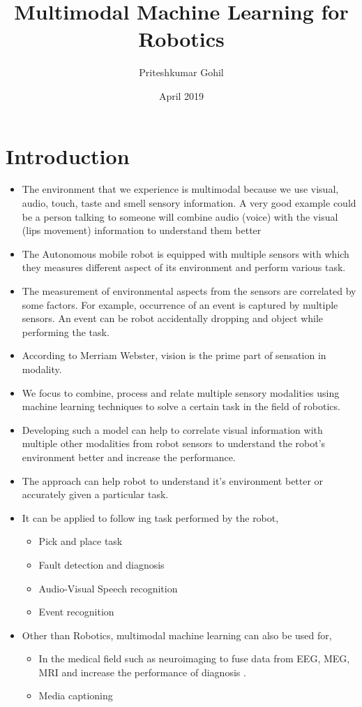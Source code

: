 \documentclass[rnd]{mas_proposal}
\title{Multimodal Machine Learning for Robotics}
\author{Priteshkumar Gohil}
\date{April 2019}
\begin{document}
\maketitle

\pagestyle{plain}

\chapter{Introduction}
\begin{itemize}
    \item The environment that we experience is multimodal because we use visual, audio, touch, taste and smell sensory information. A very good example could be a person talking to someone will combine audio (voice) with the visual (lips movement) information to understand them better
    \item The Autonomous mobile robot is equipped with multiple sensors with which they measures different aspect of its environment and perform various task. 
    \item The measurement of environmental aspects from the sensors are correlated by some factors. For example, occurrence of an event is captured by multiple sensors. An event can be robot accidentally dropping and object while performing the task. 
    \item According to Merriam Webster, vision is the prime part of sensation in modality.
    \item We focus to combine, process and relate multiple sensory modalities using machine learning techniques to solve a certain task in the field of robotics.
    \item Developing such a model can help to correlate visual information with multiple other modalities from robot sensors to understand the robot's environment better and increase the performance.
    
    \item The approach can help robot to understand it's environment better or accurately given a particular task.
	\item It can be applied to follow ing task performed by the robot,
	\begin{itemize}
		\item Pick and place task
		\item Fault detection and diagnosis
		\item Audio-Visual Speech recognition
		\item Event recognition
	\end{itemize}
	\item Other than Robotics, multimodal machine learning can also be used for,
	\begin{itemize}
		\item In the medical field such as neuroimaging to fuse data from EEG, MEG, MRI and increase the performance of diagnosis \cite{Daehne2015}.
		\item Media captioning
	\end{itemize}
\end{itemize}
\end{document}
